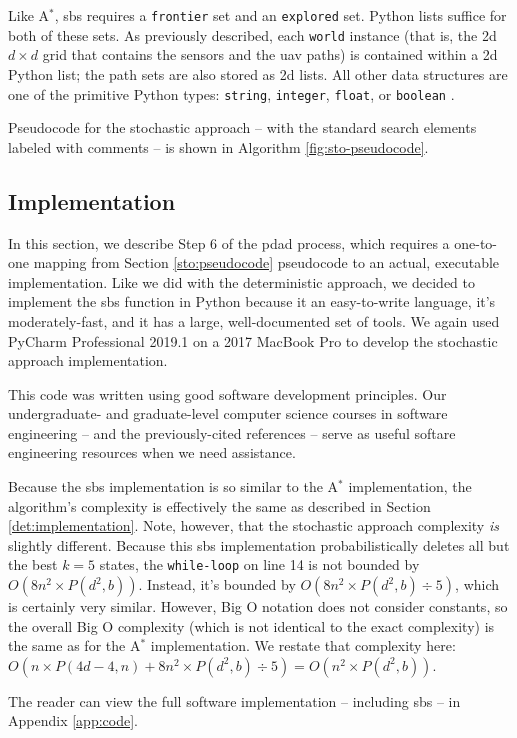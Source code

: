 \documentclass[../main.tex]{subfiles}
\begin{document}
Like A$^*$, \ac{sbs} requires a \texttt{frontier} set and an \texttt{explored} set. Python lists suffice for both of these sets. As previously described, each \texttt{world} instance (that is, the \ac{2d} $d\times d$ grid that contains the sensors and the \ac{uav} paths) is contained within a \ac{2d} Python list; the path sets are also stored as \ac{2d} lists. All other data structures are one of the primitive Python types: \texttt{string}, \texttt{integer}, \texttt{float}, or \texttt{boolean} \cite{python:primitives}.

Pseudocode for the stochastic approach -- with the standard search elements labeled with comments -- is shown in Algorithm \ref{fig:sto-pseudocode}.

\subsection{Implementation}\label{sto:implementation}

In this section, we describe Step 6 of the \ac{pdad} process, which requires a one-to-one mapping from Section \ref{sto:pseudocode} pseudocode to an actual, executable implementation. Like we did with the deterministic approach, we decided to implement the \ac{sbs} function in Python because it an easy-to-write language, it's moderately-fast, and it has a large, well-documented set of tools. We again used PyCharm Professional 2019.1 on a 2017 MacBook Pro to develop the stochastic approach implementation.

This code was written using good software development principles. Our undergraduate- and graduate-level computer science courses in software engineering -- and the previously-cited references \cite{Sommerville2010, Gamma1994, Gomaa2011} -- serve as useful softare engineering resources when we need assistance.

Because the \ac{sbs} implementation is so similar to the A$^*$ implementation, the algorithm's complexity is effectively the same as described in Section \ref{det:implementation}. Note, however, that the stochastic approach complexity \textit{is} slightly different. Because this \ac{sbs} implementation probabilistically deletes all but the best $k=5$ states, the \texttt{while-loop} on line 14 is not bounded by $O(8n^2\times P(d^2,b))$. Instead, it's bounded by $O(8n^2\times P(d^2,b)\div 5)$, which is certainly very similar. However, Big O notation does not consider constants, so the overall Big O complexity (which is not identical to the exact complexity) is the same as for the A$^*$ implementation. We restate that complexity here: $O(n\times P(4d-4,n)+8n^2\times P(d^2,b)\div 5)=O(n^2\times P(d^2,b))$.

The reader can view the full software implementation -- including \acl{sbs} -- in Appendix \ref{app:code}.
\end{document}
